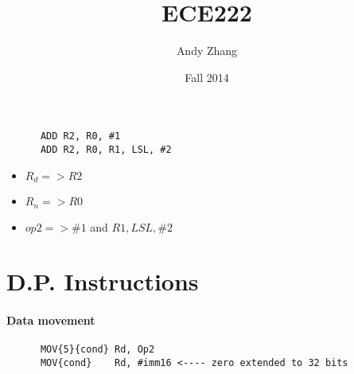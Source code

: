 \documentclass[12pt]{report}
\title{ECE222}
\author{{Andy Zhang}}
\date{{Fall 2014}}
\begin{document}
    \begin{lstlisting}
      ADD R2, R0, #1
      ADD R2, R0, R1, LSL, #2
    \end{lstlisting}
    \begin{itemize}
      \item $R_d => R2$
      \item $R_n => R0$
      \item $op2 => \#1$ and $R1, LSL, \#2$
    \end{itemize}

  \section{D.P. Instructions}
    \paragraph{Data movement}
    \begin{lstlisting}
      MOV{5}{cond} Rd, Op2
      MOV{cond}    Rd, #imm16 <---- zero extended to 32 bits
    \end{lstlisting}
\end{document}
